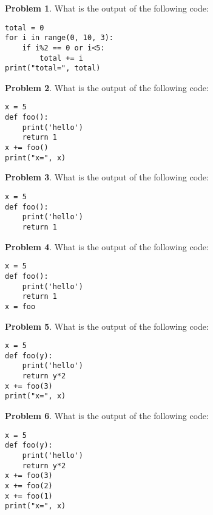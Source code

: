 \documentclass[10pt]{article}
\theoremstyle{definition}
\newtheorem{problem}{Problem}
\begin{document}
\begin{problem}
    What is the output of the following code:
\end{problem}
\begin{lstlisting}
total = 0
for i in range(0, 10, 3):
    if i%2 == 0 or i<5:
        total += i
print("total=", total)
\end{lstlisting}
\vspace{2in}


\begin{problem}
    What is the output of the following code:
\end{problem}
\begin{lstlisting}
x = 5
def foo():
    print('hello')
    return 1
x += foo()
print("x=", x)
\end{lstlisting}
\vspace{2in}


\begin{problem}
    What is the output of the following code:
\end{problem}
\begin{lstlisting}
x = 5
def foo():
    print('hello')
    return 1
\end{lstlisting}
\vspace{2in}


\begin{problem}
    What is the output of the following code:
\end{problem}
\begin{lstlisting}
x = 5
def foo():
    print('hello')
    return 1
x = foo
\end{lstlisting}
\vspace{2in}


\begin{problem}
    What is the output of the following code:
\end{problem}
\begin{lstlisting}
x = 5
def foo(y):
    print('hello')
    return y*2
x += foo(3)
print("x=", x)
\end{lstlisting}
\vspace{2in}


\begin{problem}
    What is the output of the following code:
\end{problem}
\begin{lstlisting}
x = 5
def foo(y):
    print('hello')
    return y*2
x += foo(3)
x += foo(2)
x += foo(1)
print("x=", x)
\end{lstlisting}
\vspace{2in}
\end{document}
